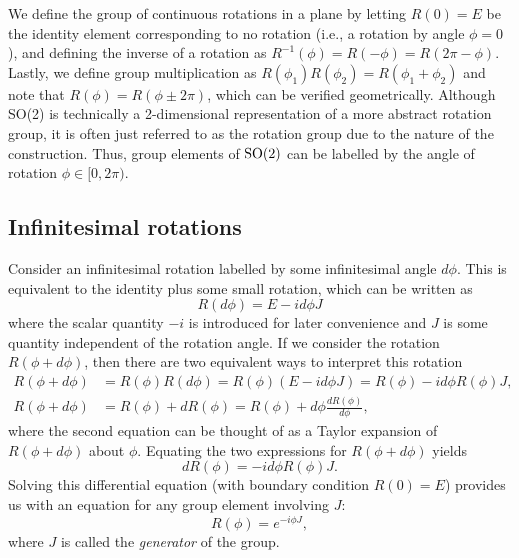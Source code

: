     We define the group of continuous rotations in a plane by letting $R(0) = E$ be the identity element corresponding to no rotation (i.e., a rotation by angle $\phi=0$), and defining the inverse of a rotation as $R^{-1}(\phi) = R(-\phi) = R(2\pi-\phi)$. Lastly, we define group multiplication as $R(\phi_1)R(\phi_2) = R(\phi_1+\phi_2)$ and note that $R(\phi) = R(\phi\pm2\pi)$, which can be verified geometrically. Although SO(2) is technically a 2-dimensional representation of a more abstract rotation group, it is often just referred to as the rotation group due to the nature of the construction. Thus, group elements of $\textrm{SO}{(2)}$ can be labelled by the angle of rotation $\phi\in[0,2\pi)$.

    \subsection{Infinitesimal rotations}\label{sub:inf_rot}
    Consider an infinitesimal rotation labelled by some infinitesimal angle $d\phi$. This is equivalent to the identity plus some small rotation, which can be written as
    \begin{equation}
        R(d\phi) = E - i d\phi J \label{eq:dphi}
    \end{equation}
    where the scalar quantity $-i$ is introduced for later convenience and $J$ is some quantity independent of the rotation angle. If we consider the rotation $R(\phi + d\phi)$, then there are two equivalent ways to interpret this rotation
    \begin{align}
        R(\phi + d\phi) &= R(\phi)R(d\phi) = R(\phi)(E - i d\phi J) = R(\phi) - i d\phi R(\phi)J,\label{eq:dphi1} \\
        R(\phi + d\phi) &= R(\phi) + dR(\phi) = R(\phi) + d\phi\frac{dR(\phi)}{d\phi},\label{eq:dphi2}
    \end{align}
    where the second equation can be thought of as a Taylor expansion of $R(\phi + d\phi)$ about $\phi$. Equating the two expressions for $R(\phi + d\phi)$ yields
    \begin{equation}
        dR(\phi) = -id\phi R(\phi)J.
    \end{equation}
    Solving this differential equation (with boundary condition $R(0)=E$) provides us with an equation for any group element involving $J$:
    \begin{equation}
        R(\phi) = e^{-i\phi J},
    \end{equation}
    where $J$ is called the \textit{generator} of the group.

